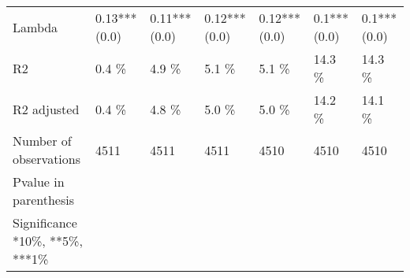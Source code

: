\begin{tabular}{lllllll}
Lambda                          &  0.13***(0.0) &   0.11***(0.0) &   0.12***(0.0) &   0.12***(0.0) &     0.1***(0.0) &    0.1***(0.0) \\
R2                              &         0.4 \% &          4.9 \% &          5.1 \% &          5.1 \% &          14.3 \% &         14.3 \% \\
R2 adjusted                     &         0.4 \% &          4.8 \% &          5.0 \% &          5.0 \% &          14.2 \% &         14.1 \% \\
Number of observations          &          4511 &           4511 &           4511 &           4510 &            4510 &           4510 \\
Pvalue in parenthesis           &               &                &                &                &                 &                \\
Significance *10\%, **5\%, ***1\%  &               &                &                &                &                 &                \\
\bottomrule
\end{tabular}
